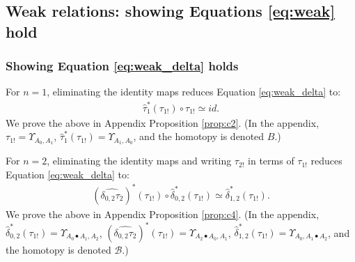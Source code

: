 \subsection{Weak relations: showing Equations \ref{eq:weak} hold}
\subsubsection{Showing Equation \ref{eq:weak_delta} holds}
For $n=1$, eliminating the identity 
maps reduces Equation \ref{eq:weak_delta} to:
\begin{align*} 
\hat{\tau}_1^*(\tau_{1!}) \circ \tau_{1!} 
\simeq id.
\end{align*}
We prove the above in Appendix Proposition 
\ref{prop:c2}. (In the appendix, 
$\tau_{1!} = \Upsilon_{A_0,A_1}$, 
$\hat{\tau}_1^*(\tau_{1!}) = \Upsilon_{A_1,A_0}$, 
and the homotopy is denoted $B$.)

For $n=2$, eliminating the identity 
maps and writing $\tau_{2!}$ in terms 
of $\tau_{1!}$ reduces Equation \ref{eq:weak_delta} to:
\begin{align*} 
(\widehat{\delta_{0,2}\tau_2})^*(\tau_{1!}) \circ 
  \hat{\delta}_{0,2}^*(\tau_{1!})
\simeq \hat{\delta}_{1,2}^*(\tau_{1!}).
\end{align*}
We prove the above in Appendix Proposition 
\ref{prop:c4}. (In the appendix, 
$\hat{\delta}_{0,2}^*(\tau_{1!}) = 
\Upsilon_{A_0\bullet A_1, A_2}$, 
$(\widehat{\delta_{0,2}\tau_2})^*(\tau_{1!}) 
= \Upsilon_{A_2\bullet A_0,A_1}$, 
$\hat{\delta}_{1,2}^*(\tau_{1!}) =
\Upsilon_{A_0, A_1\bullet A_2}$, 
and the homotopy is denoted 
$\mathcal{B}$.)

